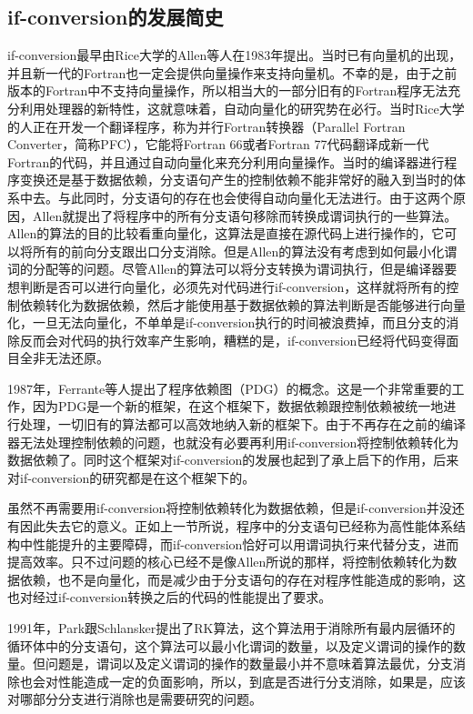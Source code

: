 \subsection{if-conversion的发展简史}

if-conversion最早由Rice大学的Allen等人在1983年提出\cite{allen1983Concondeptodatdep}。当时已有向量机的出现，并且新一代的Fortran也一定会提供向量操作来支持向量机。不幸的是，由于之前版本的Fortran中不支持向量操作，所以相当大的一部分旧有的Fortran程序无法充分利用处理器的新特性，这就意味着，自动向量化的研究势在必行。当时Rice大学的人正在开发一个翻译程序，称为并行Fortran转换器（Parallel Fortran Converter，简称PFC），它能将Fortran 66或者Fortran 77代码翻译成新一代Fortran的代码，并且通过自动向量化来充分利用向量操作。当时的编译器进行程序变换还是基于数据依赖，分支语句产生的控制依赖不能非常好的融入到当时的体系中去。与此同时，分支语句的存在也会使得自动向量化无法进行。由于这两个原因，Allen就提出了将程序中的所有分支语句移除而转换成谓词执行的一些算法。Allen的算法的目的比较看重向量化，这算法是直接在源代码上进行操作的，它可以将所有的前向分支跟出口分支消除。但是Allen的算法没有考虑到如何最小化谓词的分配等的问题。尽管Allen的算法可以将分支转换为谓词执行，但是编译器要想判断是否可以进行向量化，必须先对代码进行if-conversion，这样就将所有的控制依赖转化为数据依赖，然后才能使用基于数据依赖的算法判断是否能够进行向量化，一旦无法向量化，不单单是if-conversion执行的时间被浪费掉，而且分支的消除反而会对代码的执行效率产生影响，糟糕的是，if-conversion已经将代码变得面目全非无法还原。

1987年，Ferrante等人提出了程序依赖图（PDG）的概念\cite{ferrante1987prodepgraitsuseopt}。这是一个非常重要的工作，因为PDG是一个新的框架，在这个框架下，数据依赖跟控制依赖被统一地进行处理，一切旧有的算法都可以高效地纳入新的框架下。由于不再存在之前的编译器无法处理控制依赖的问题，也就没有必要再利用if-conversion将控制依赖转化为数据依赖了。同时这个框架对if-conversion的发展也起到了承上启下的作用，后来对if-conversion的研究都是在这个框架下的。

虽然不再需要用if-conversion将控制依赖转化为数据依赖，但是if-conversion并没还有因此失去它的意义。正如上一节所说，程序中的分支语句已经称为高性能体系结构中性能提升的主要障碍，而if-conversion恰好可以用谓词执行来代替分支，进而提高效率。只不过问题的核心已经不是像Allen所说的那样，将控制依赖转化为数据依赖，也不是向量化，而是减少由于分支语句的存在对程序性能造成的影响，这也对经过if-conversion转换之后的代码的性能提出了要求。

1991年，Park跟Schlansker提出了RK算法\cite{JosephC.H.Park1991}，这个算法用于消除所有最内层循环的循环体中的分支语句，这个算法可以最小化谓词的数量，以及定义谓词的操作的数量。但问题是，谓词以及定义谓词的操作的数量最小并不意味着算法最优，分支消除也会对性能造成一定的负面影响，所以，到底是否进行分支消除，如果是，应该对哪部分分支进行消除也是需要研究的问题。

